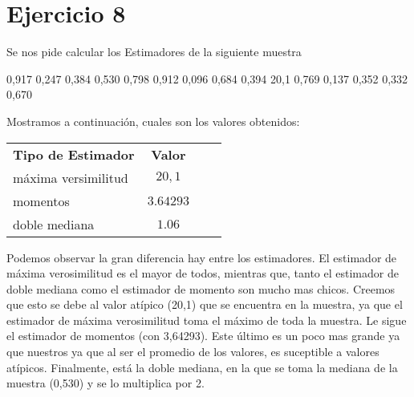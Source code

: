 \section{Ejercicio 8}

Se nos pide calcular los Estimadores de la siguiente muestra

\begin{center}
0,917 0,247 0,384 0,530 0,798 0,912 0,096 0,684 0,394 20,1 0,769 0,137 0,352 0,332 0,670
\end{center}

Mostramos a continuaci\'on, cuales son los valores obtenidos:

\begin{table}[h]
	\centering
	\begin{tabular}{lccc}
		\textbf{Tipo de Estimador} & \textbf{Valor} \\
		m\'axima versimilitud  &  $20,1$ \\
		momentos & $3.64293$ \\
		doble mediana & $1.06$
	\end{tabular}
\end{table}

Podemos observar la gran diferencia hay entre los estimadores. El estimador de m\'axima verosimilitud es el mayor de todos, mientras que, tanto el estimador de doble mediana como el estimador de momento son mucho mas chicos. Creemos que esto se debe al valor at\'ipico (20,1) que se encuentra en la muestra, ya que el estimador de m\'axima verosimilitud toma el m\'aximo de toda la muestra. Le sigue el estimador de momentos (con 3,64293). Este \'ultimo es un poco mas grande ya que nuestros ya que al ser el promedio de los valores, es suceptible a valores at\'ipicos. Finalmente, est\'a la doble mediana, en la que se toma la mediana de la muestra (0,530) y se lo multiplica por 2. 